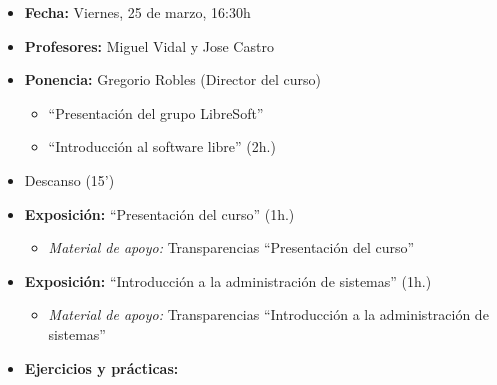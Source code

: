 \begin{itemize}
  \item \textbf{Fecha:} Viernes, 25 de marzo, 16:30h
  \item \textbf{Profesores:} Miguel Vidal y Jose Castro
  \item \textbf{Ponencia:} Gregorio Robles (Director del curso)
    \begin{itemize}
      \item ``Presentación del grupo LibreSoft''
      \item ``Introducción al software libre'' (2h.)   
    \end{itemize}
  \item Descanso (15')
  \item \textbf{Exposición:} ``Presentación del curso'' (1h.)
    \begin{itemize}
      \item \textit{Material de apoyo:} Transparencias ``Presentación del curso'' 
    \end{itemize}
  \item \textbf{Exposición:} ``Introducción a la administración de sistemas'' (1h.)
    \begin{itemize}
      \item \textit{Material de apoyo:} Transparencias ``Introducción a la administración de sistemas''
    \end{itemize}
  \item \textbf{Ejercicios y prácticas:}
\end{itemize}


